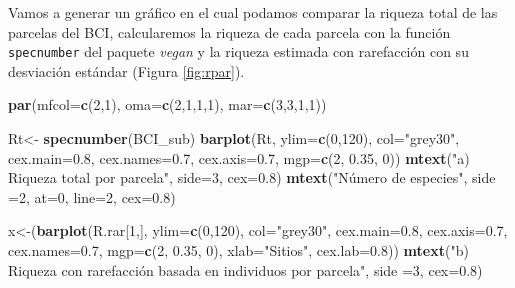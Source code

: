 \documentclass[]{book}
\newenvironment{Shaded}{\begin{snugshade}}{\end{snugshade}}
\newcommand{\KeywordTok}[1]{\textcolor[rgb]{0.13,0.29,0.53}{\textbf{{#1}}}}
\newcommand{\DataTypeTok}[1]{\textcolor[rgb]{0.13,0.29,0.53}{{#1}}}
\newcommand{\DecValTok}[1]{\textcolor[rgb]{0.00,0.00,0.81}{{#1}}}
\newcommand{\FloatTok}[1]{\textcolor[rgb]{0.00,0.00,0.81}{{#1}}}
\newcommand{\StringTok}[1]{\textcolor[rgb]{0.31,0.60,0.02}{{#1}}}
\newcommand{\NormalTok}[1]{{#1}}
\begin{document}
Vamos a generar un gráfico en el cual podamos comparar la riqueza total
de las parcelas del BCI, calcularemos la riqueza de cada parcela con la
función \texttt{specnumber} del paquete \emph{vegan} y la riqueza
estimada con rarefacción con su desviación estándar (Figura
\ref{fig:rpar}).

\begin{Shaded}
\begin{Highlighting}[]
\KeywordTok{par}\NormalTok{(}\DataTypeTok{mfcol=}\KeywordTok{c}\NormalTok{(}\DecValTok{2}\NormalTok{,}\DecValTok{1}\NormalTok{), }\DataTypeTok{oma=}\KeywordTok{c}\NormalTok{(}\DecValTok{2}\NormalTok{,}\DecValTok{1}\NormalTok{,}\DecValTok{1}\NormalTok{,}\DecValTok{1}\NormalTok{), }\DataTypeTok{mar=}\KeywordTok{c}\NormalTok{(}\DecValTok{3}\NormalTok{,}\DecValTok{3}\NormalTok{,}\DecValTok{1}\NormalTok{,}\DecValTok{1}\NormalTok{))}

\NormalTok{Rt<-}\StringTok{ }\KeywordTok{specnumber}\NormalTok{(BCI_sub)}
\KeywordTok{barplot}\NormalTok{(Rt, }\DataTypeTok{ylim=}\KeywordTok{c}\NormalTok{(}\DecValTok{0}\NormalTok{,}\DecValTok{120}\NormalTok{), }\DataTypeTok{col=}\StringTok{"grey30"}\NormalTok{, }\DataTypeTok{cex.main=}\FloatTok{0.8}\NormalTok{,}
         \DataTypeTok{cex.names=}\FloatTok{0.7}\NormalTok{, }\DataTypeTok{cex.axis=}\FloatTok{0.7}\NormalTok{, }\DataTypeTok{mgp=}\KeywordTok{c}\NormalTok{(}\DecValTok{2}\NormalTok{, }\FloatTok{0.35}\NormalTok{, }\DecValTok{0}\NormalTok{))}
\KeywordTok{mtext}\NormalTok{(}\StringTok{"a) Riqueza total por parcela"}\NormalTok{, }\DataTypeTok{side=}\DecValTok{3}\NormalTok{, }\DataTypeTok{cex=}\FloatTok{0.8}\NormalTok{)}
\KeywordTok{mtext}\NormalTok{(}\StringTok{"Número de especies"}\NormalTok{, }\DataTypeTok{side =}\DecValTok{2}\NormalTok{, }\DataTypeTok{at=}\DecValTok{0}\NormalTok{, }\DataTypeTok{line=}\DecValTok{2}\NormalTok{, }\DataTypeTok{cex=}\FloatTok{0.8}\NormalTok{)}

\NormalTok{x<-(}\KeywordTok{barplot}\NormalTok{(R.rar[}\DecValTok{1}\NormalTok{,], }\DataTypeTok{ylim=}\KeywordTok{c}\NormalTok{(}\DecValTok{0}\NormalTok{,}\DecValTok{120}\NormalTok{), }\DataTypeTok{col=}\StringTok{"grey30"}\NormalTok{, }
            \DataTypeTok{cex.main=}\FloatTok{0.8}\NormalTok{, }\DataTypeTok{cex.axis=}\FloatTok{0.7}\NormalTok{, }\DataTypeTok{cex.names=}\FloatTok{0.7}\NormalTok{, }\DataTypeTok{mgp=}\KeywordTok{c}\NormalTok{(}\DecValTok{2}\NormalTok{, }\FloatTok{0.35}\NormalTok{, }\DecValTok{0}\NormalTok{), }
            \DataTypeTok{xlab=}\StringTok{"Sitios"}\NormalTok{, }\DataTypeTok{cex.lab=}\FloatTok{0.8}\NormalTok{))}
\KeywordTok{mtext}\NormalTok{(}\StringTok{"b) Riqueza con rarefacción basada en individuos por parcela"}\NormalTok{, }\DataTypeTok{side =}\DecValTok{3}\NormalTok{, }\DataTypeTok{cex=}\FloatTok{0.8}\NormalTok{)}


\end{Highlighting}
\end{Shaded}
\end{document}
